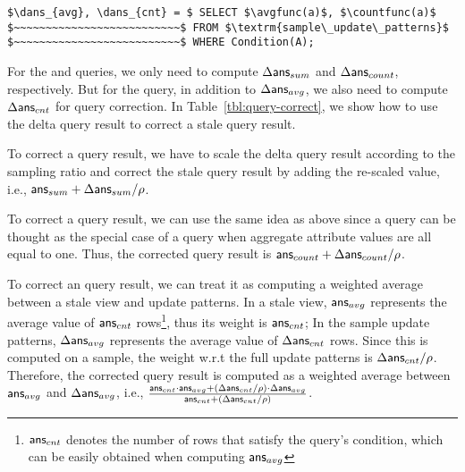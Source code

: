 \vspace{-.25em}

\begin{lstlisting}[mathescape,basicstyle={\scriptsize}]
$\dans_{avg}, \dans_{cnt} = $ SELECT $\avgfunc(a)$, $\countfunc(a)$ 
$~~~~~~~~~~~~~~~~~~~~~~~~~~$ FROM $\textrm{sample\_update\_patterns}$
$~~~~~~~~~~~~~~~~~~~~~~~~~~$ WHERE Condition(A);
\end{lstlisting}

\vspace{-.25em}

For the \sumfunc and \countfunc queries, we only need to compute $\Delta\textsf{ans}_{sum}$ and $\Delta\textsf{ans}_{count}$, respectively. But for the \avgfunc query, in addition to $\Delta\textsf{ans}_{avg}$, we also need to compute $\Delta\textsf{ans}_{cnt}$ for query correction.
In Table~\ref{tbl:query-correct}, we show how to use the delta query result to correct a stale query result. 


To correct a \sumfunc query result, we have to scale the delta query result according to the sampling ratio and correct the stale query result by adding the re-scaled value, i.e., $\textsf{ans}_{sum}+\Delta\textsf{ans}_{sum}/\rho $. 

To correct a \countfunc query result, we can use the same idea as above since a \countfunc query can be thought as the special case of a \sumfunc query when aggregate attribute values are all equal to one. Thus, the corrected \countfunc query result is $\textsf{ans}_{count}+\Delta\textsf{ans}_{count}/\rho $.

To correct an \avgfunc query result, we can treat it as computing a weighted average between a stale view and update patterns. In a stale view, $\textsf{ans}_{avg}$ represents the average value of $\textsf{ans}_{cnt}$ rows\footnote{\small $\textsf{ans}_{cnt}$ denotes the number of rows that satisfy the \avgfunc query's condition, which can be easily obtained when computing $\textsf{ans}_{avg}$}, thus its weight is $\textsf{ans}_{cnt}$; In the sample update patterns, $\Delta\textsf{ans}_{avg}$ represents the average value of $\Delta\textsf{ans}_{cnt}$ rows. Since this is computed on a sample, the weight w.r.t the full update patterns is  $\Delta\textsf{ans}_{cnt}/\rho $. Therefore, the corrected \avgfunc query result is computed as a weighted average between $\textsf{ans}_{avg}$ and $\Delta\textsf{ans}_{avg}$, i.e., $\frac{\textsf{ans}_{cnt}\cdot\textsf{ans}_{avg}+(\Delta\textsf{ans}_{cnt}/\rho )\cdot\Delta\textsf{ans}_{avg}}{\textsf{ans}_{cnt}+(\Delta\textsf{ans}_{cnt}/\rho )}$.


